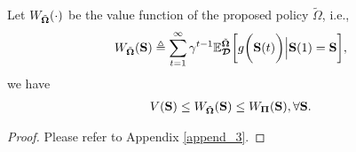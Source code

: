 \begin{lemma}
    \label{lemma:bound}
    Let $W_{\tilde{\boldsymbol{\Omega}}}(\cdot)$ be the value function of the proposed policy $\tilde{\Omega}$, i.e.,
    {\small
    \begin{align}
        W_{\tilde{\boldsymbol{\Omega}}}(\mathbf{S}) \triangleq
        \sum_{t=1}^{\infty} \gamma^{t-1} \mathbb{E}^{\tilde{\boldsymbol{\Omega}}}_{\boldsymbol{\mathcal{D}}} \bigg[
            g\bigg(\mathbf{S}(t)\bigg) \Big| \mathbf{S}(1)=\mathbf{S}
        \bigg],
        \label{eqn:bound}
    \end{align}
    }%
    we have
    {\small
    \begin{align}
        V(\mathbf{S})
        \leq W_{\tilde{\boldsymbol{\Omega}}}(\mathbf{S})
        \leq W_{\boldsymbol{\Pi}}(\mathbf{S}),
        \forall \mathbf{S}.
    \end{align}
    }%
\end{lemma}
\begin{proof}
    Please refer to Appendix \ref{append_3}.
\end{proof}

